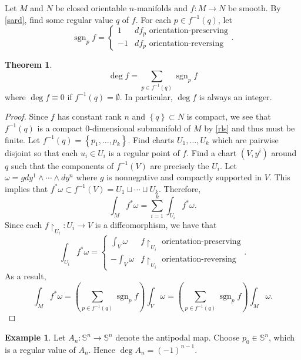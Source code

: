 \documentclass[10pt,letterpaper,cm]{nupset}
\theoremstyle{definition}
\newtheorem{exmp}[definition]{Example}
\theoremstyle{theorem}
\newtheorem{theorem}[definition]{Theorem}
\theoremstyle{remark}
\renewcommand{\S}{\mathbb S}
\newcommand{\1}{\mathbf{1}}
\newcommand{\0}{\vec 0}
\DeclareMathOperator{\sgn}{sgn}
\begin{document}
Let $M$ and $N$ be closed orientable $n$-manifolds and $f: M \to N$ be smooth. By \cref{sard}, find some regular value $q$ of $f$. For each $p\in f^{-1}(q)$, let 
$$ \sgn_pf = \begin{cases}
1 & df_p \text{ orientation-preserving} 
\\ {-1}  & df_p \text{ orientation-reversing} \end{cases}.$$ 

\begin{theorem}
$$\deg f = \sum_{p\in f^{-1}(q)} \sgn_pf$$ where $\deg f \equiv 0$ if $f^{-1}(q) = \emptyset$.
In particular, $\deg f$ is always an integer. 
\end{theorem}
\begin{proof}
Since $f$ has constant rank $n$ and $\left\{q\right\}\subset N$ is compact, we see that $f^{-1}(q)$ is a compact $0$-dimensional submanifold  of $M$ by \cref{rls}  and thus must be finite. Let $f^{-1}(q) = \left\{p_1, \ldots, p_k\right\}$. Find  charts $U_1, \ldots, U_k$ which are pairwise disjoint so that each $u_i \in U_i$ is a regular point of $f$. Find a chart $\left(V, y^i\right)$ around $q$ such that the components of $f^{-1}(V)$ are precisely the $U_i$. Let $\omega = gdy^1 \wedge \cdots \wedge dy^n$ where $g$ is nonnegative and compactly supported in $V$. This implies that $f^{\ast}\omega \subset f^{-1}(V) =U_1 \sqcup \cdots \sqcup U_k$. Therefore, $$  \int_Mf^{\ast}\omega =\sum_{i=1}^k\int_{U_i}f^{\ast}\omega .$$ Since each $f\restriction_{U_i} : U_i \to V$ is a diffeomorphism, we have that $$ \int_{U_i}f^{\ast}\omega =
\begin{cases}
\int_{V} \omega & f\restriction_{U_i}  \text{ orientation-preserving} 
\\ {-\int_V\omega}  & f\restriction_{U_i} \text{ orientation-reversing}
\end{cases} .$$ As a result, $$\int_M f^{\ast} \omega  =\left(\sum_{p\in f^{-1}(q)} \sgn_pf \right)\int_V \omega =\left(\sum_{p\in f^{-1}(q)} \sgn_pf \right)\int_M \omega .$$
\end{proof}

\begin{exmp}
Let $A_n: \S^n \to \S^n$ denote the antipodal map. Choose $p_0 \in \S^n$, which is a regular value of $A_n$. Hence $\deg A_n = \left({-1}\right)^{n-1}$.
\end{exmp}
\end{document}
